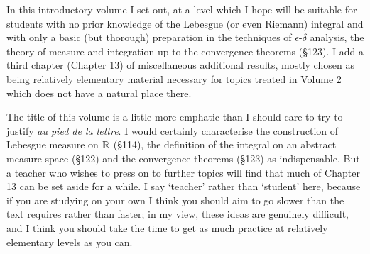 
\def\volumename{The irreducible minimum}



In this introductory volume I set out, at a level which I hope will be
suitable for students with no prior knowledge of the Lebesgue (or even
Riemann) integral
and with only a basic (but thorough) preparation in the techniques of
$\epsilon$-$\delta$ analysis, the theory of measure and integration up
to the convergence theorems (\S123).   I add a third chapter (Chapter
13) of miscellaneous additional results, mostly chosen as being
relatively elementary material necessary for topics treated in Volume 2
which does not have a natural place there.

The title of this volume is a little more emphatic than I should care to
try to justify {\it au pied de la lettre}.   I would certainly
characterise the construction of Lebesgue measure on $\Bbb R$ (\S114),
the definition of the integral on an abstract measure space (\S122)
and the convergence theorems (\S123) as indispensable.   But a teacher
who wishes to press on to further topics will find that much of Chapter
13 can be set aside for a while.   I say `teacher' rather than
`student' here, because if you are studying on your own I think you
should aim to go slower than the text requires rather than faster;  in
my view, these ideas are genuinely difficult, and I think you should
take the time to get as much practice at relatively elementary levels as
you can.

